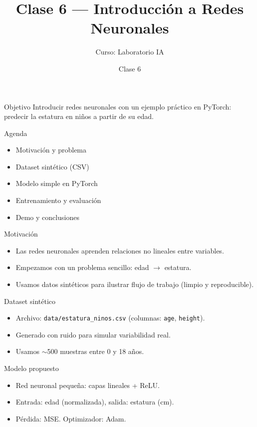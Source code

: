 \documentclass{beamer}
\title{Clase 6 — Introducción a Redes Neuronales}
\author{Curso: Laboratorio IA}
\date{Clase 6}
\begin{document}
\frame{\titlepage}

\begin{frame}{Objetivo}
  Introducir redes neuronales con un ejemplo práctico en PyTorch: predecir la estatura en niños a partir de su edad.
\end{frame}

\begin{frame}{Agenda}
  \begin{itemize}
    \item Motivación y problema
    \item Dataset sintético (CSV)
    \item Modelo simple en PyTorch
    \item Entrenamiento y evaluación
    \item Demo y conclusiones
  \end{itemize}
\end{frame}

\begin{frame}{Motivación}
  \begin{itemize}
    \item Las redes neuronales aprenden relaciones no lineales entre variables.
    \item Empezamos con un problema sencillo: edad $\rightarrow$ estatura.
    \item Usamos datos sintéticos para ilustrar flujo de trabajo (limpio y reproducible).
  \end{itemize}
\end{frame}

\begin{frame}{Dataset sintético}
  \begin{itemize}
    \item Archivo: \texttt{data/estatura\_ninos.csv} (columnas: \texttt{age}, \texttt{height}).
    \item Generado con ruido para simular variabilidad real.
    \item Usamos $\sim$500 muestras entre 0 y 18 años.
  \end{itemize}
\end{frame}

\begin{frame}{Modelo propuesto}
  \begin{itemize}
    \item Red neuronal pequeña: capas lineales + ReLU.
    \item Entrada: edad (normalizada), salida: estatura (cm).
    \item Pérdida: MSE. Optimizador: Adam.
  \end{itemize}
\end{frame}
\end{document}
